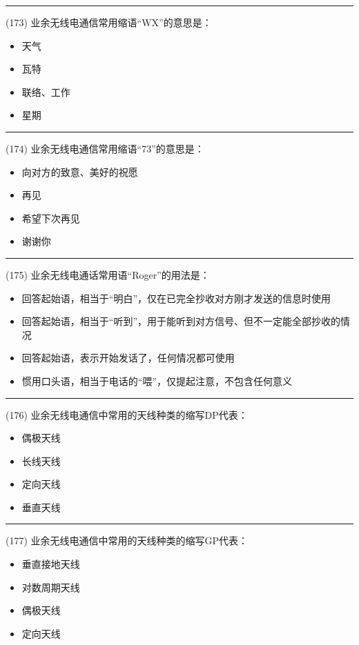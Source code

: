 \documentclass[twocolumn]{ctexart}  %
\begin{document}
\noindent\rule{0.5\textwidth}{1pt}
\heiti (173) 业余无线电通信常用缩语“WX”的意思是： \songti {\color{gray} [LK0396] }
\begin{itemize}
	\item  天气
	\item  瓦特
	\item  联络、工作
	\item  星期
\end{itemize}


\noindent\rule{0.5\textwidth}{1pt}
\heiti (174) 业余无线电通信常用缩语“73”的意思是： \songti {\color{gray} [LK0402] }
\begin{itemize}
	\item  向对方的致意、美好的祝愿
	\item  再见
	\item  希望下次再见
	\item  谢谢你
\end{itemize}


\noindent\rule{0.5\textwidth}{1pt}
\heiti (175) 业余无线电通话常用语“Roger”的用法是： \songti {\color{gray} [LK0404] }
\begin{itemize}
	\item  回答起始语，相当于“明白”，仅在已完全抄收对方刚才发送的信息时使用
	\item  回答起始语，相当于“听到”，用于能听到对方信号、但不一定能全部抄收的情况
	\item  回答起始语，表示开始发话了，任何情况都可使用
	\item  惯用口头语，相当于电话的“喂”，仅提起注意，不包含任何意义
\end{itemize}


\noindent\rule{0.5\textwidth}{1pt}
\heiti (176) 业余无线电通信中常用的天线种类的缩写DP代表： \songti {\color{gray} [LK0405] }
\begin{itemize}
	\item  偶极天线
	\item  长线天线
	\item  定向天线
	\item  垂直天线
\end{itemize}


\noindent\rule{0.5\textwidth}{1pt}
\heiti (177) 业余无线电通信中常用的天线种类的缩写GP代表： \songti {\color{gray} [LK0407] }
\begin{itemize}
	\item  垂直接地天线
	\item  对数周期天线
	\item  偶极天线
	\item  定向天线
\end{itemize}
\end{document}
